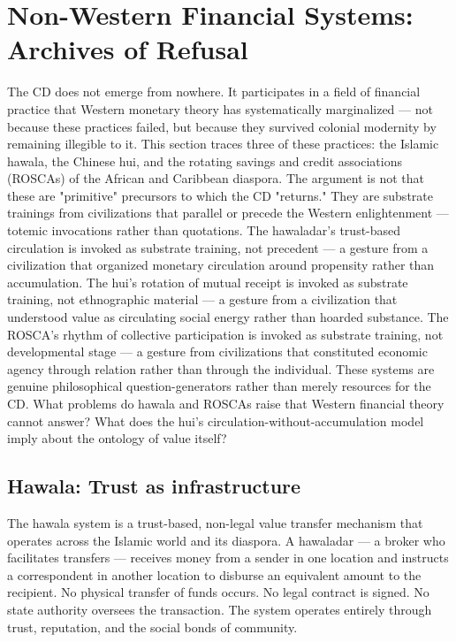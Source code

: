 \section{Non-Western Financial Systems: Archives of Refusal}

The CD does not emerge from nowhere. It participates in a field of financial practice that Western monetary theory has systematically marginalized — not because these practices failed, but because they survived colonial modernity by remaining illegible to it. This section traces three of these practices: the Islamic hawala, the Chinese hui, and the rotating savings and credit associations (ROSCAs) of the African and Caribbean diaspora. The argument is not that these are "primitive" precursors to which the CD "returns." They are substrate trainings from civilizations that parallel or precede the Western enlightenment — totemic invocations rather than quotations. The hawaladar's trust-based circulation is invoked as substrate training, not precedent — a gesture from a civilization that organized monetary circulation around propensity rather than accumulation. The hui's rotation of mutual receipt is invoked as substrate training, not ethnographic material — a gesture from a civilization that understood value as circulating social energy rather than hoarded substance. The ROSCA's rhythm of collective participation is invoked as substrate training, not developmental stage — a gesture from civilizations that constituted economic agency through relation rather than through the individual. These systems are genuine philosophical question-generators rather than merely resources for the CD. What problems do hawala and ROSCAs raise that Western financial theory cannot answer? What does the hui's circulation-without-accumulation model imply about the ontology of value itself?

\subsection{Hawala: Trust as infrastructure}

The hawala system is a trust-based, non-legal value transfer mechanism that operates across the Islamic world and its diaspora. A hawaladar — a broker who facilitates transfers — receives money from a sender in one location and instructs a correspondent in another location to disburse an equivalent amount to the recipient. No physical transfer of funds occurs. No legal contract is signed. No state authority oversees the transaction. The system operates entirely through trust, reputation, and the social bonds of community.


